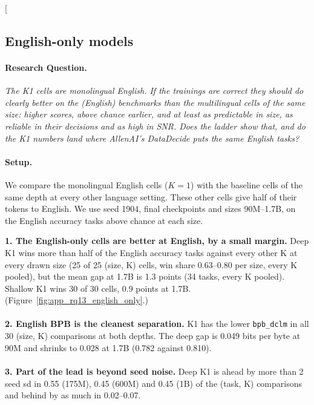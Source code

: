 \clearpage
\twocolumn[{%
\subsection{English-only models}
\label{app:rq13_english_only}

\noindent\begin{minipage}[t]{0.485\textwidth}
\vspace{0pt}
\paragraph{Research Question.} \emph{The K1 cells are monolingual English. If the trainings are correct they should do clearly better on the (English) benchmarks than the multilingual cells of the same size: higher scores, above chance earlier, and at least as predictable in size, as reliable in their decisions and as high in SNR. Does the ladder show that, and do the K1 numbers land where AllenAI's DataDecide puts the same English tasks?}

\paragraph{Setup.} We compare the monolingual English cells ($K = 1$) with the baseline cells of the same depth at every other language setting. These other cells give half of their tokens to English. We use seed 1904, final checkpoints and sizes 90M--1.7B, on the English accuracy tasks above chance at each size.
\end{minipage}\hfill
\begin{minipage}[t]{0.485\textwidth}
\vspace{0pt}
\begin{rqfinding}
\textbf{1. The English-only cells are better at English, by a small margin.} Deep K1 wins more than half of the English accuracy tasks against every other K at every drawn size (25 of 25 (size, K) cells, win share 0.63--0.80 per size, every K pooled), but the mean gap at 1.7B is 1.3 points (34 tasks, every K pooled). Shallow K1 wins 30 of 30 cells, 0.9 points at 1.7B. (Figure~\ref{fig:app_rq13_english_only}.)
\\
\\
\textbf{2. English BPB is the cleanest separation.} K1 has the lower \texttt{bpb\_dclm} in all 30 (size, K) comparisons at both depths. The deep gap is 0.049 bits per byte at 90M and shrinks to 0.028 at 1.7B (0.782 against 0.810).
\\
\\
\textbf{3. Part of the lead is beyond seed noise.} Deep K1 is ahead by more than 2 seed sd in 0.55 (175M), 0.45 (600M) and 0.45 (1B) of the (task, K) comparisons and behind by as much in 0.02--0.07.
\end{rqfinding}
\end{minipage}

}
